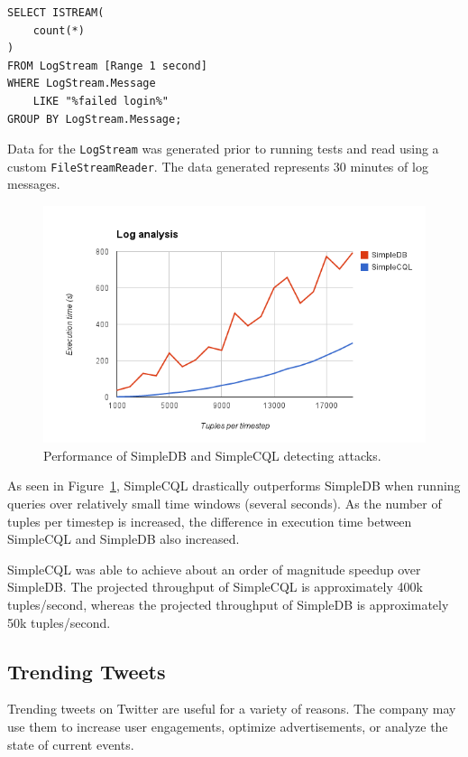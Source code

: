 \documentclass[a4paper, 10pt, conference]{IEEEconf}
\begin{document}
\begin{lstlisting}
SELECT ISTREAM(
    count(*)
)
FROM LogStream [Range 1 second]
WHERE LogStream.Message
	LIKE "%failed login%"
GROUP BY LogStream.Message;
\end{lstlisting}

Data for the \texttt{LogStream} was generated prior to running tests and read using a custom \texttt{FileStreamReader}.  The data generated represents 30 minutes of log messages.

\begin{figure}[h!]
    \centering
    \centerline{\includegraphics[totalheight=5cm]{attack.png}}
    \caption{Performance of SimpleDB and SimpleCQL detecting attacks.}
    \label{fig:attack}
\end{figure}

As seen in Figure~\ref{fig:attack}, SimpleCQL drastically outperforms SimpleDB when running queries over relatively small time windows (several seconds).  As the number of tuples per timestep is increased, the difference in execution time between SimpleCQL and SimpleDB also increased.  

SimpleCQL was able to achieve about an order of magnitude speedup over SimpleDB.  The projected throughput of SimpleCQL is approximately 400k tuples/second, whereas the projected throughput of SimpleDB is approximately 50k tuples/second.

\subsection{Trending Tweets}
Trending tweets on Twitter are useful for a variety of reasons.  The company may use them to increase user engagements, optimize advertisements, or analyze the state of current events.  
\end{document}
